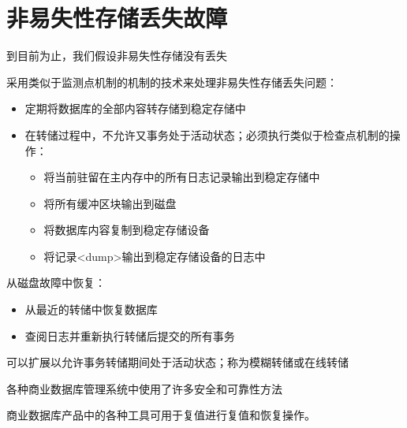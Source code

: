 \section{非易失性存储丢失故障}

到目前为止，我们假设非易失性存储没有丢失

采用类似于监测点机制的机制的技术来处理非易失性存储丢失问题：
\begin{itemize}
    \item 定期将数据库的全部内容转存储到稳定存储中
    \item 在转储过程中，不允许又事务处于活动状态；必须执行类似于检查点机制的操作：
       \begin{itemize}
           \item 将当前驻留在主内存中的所有日志记录输出到稳定存储中
           \item 将所有缓冲区块输出到磁盘
           \item 将数据库内容复制到稳定存储设备
           \item 将记录<dump>输出到稳定存储设备的日志中
       \end{itemize}
\end{itemize}

从磁盘故障中恢复：
\begin{itemize}
    \item 从最近的转储中恢复数据库
    \item 查阅日志并重新执行转储后提交的所有事务
\end{itemize}

可以扩展以允许事务转储期间处于活动状态；称为模糊转储或在线转储

各种商业数据库管理系统中使用了许多安全和可靠性方法

商业数据库产品中的各种工具可用于复值进行复值和恢复操作。
